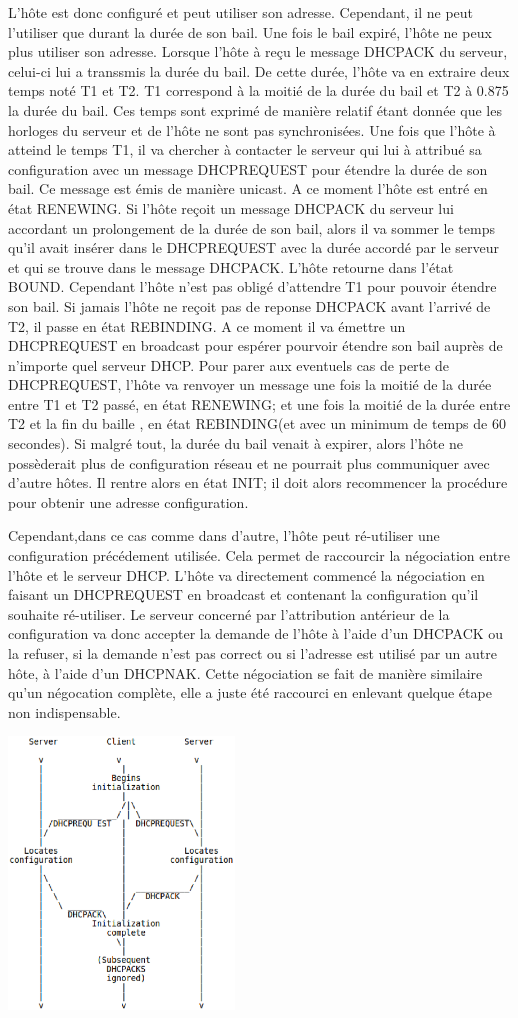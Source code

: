 L'hôte est donc configuré et peut utiliser son adresse. Cependant, il ne peut
l'utiliser que durant la durée de son bail. Une fois le bail expiré, l'hôte ne
peux plus utiliser son adresse. Lorsque l'hôte à reçu le message DHCPACK du
serveur, celui-ci lui a transsmis la durée du bail. De cette durée, l'hôte va
en extraire deux temps noté T1 et T2. T1 correspond à la moitié de la durée du
bail et T2 à 0.875 la durée du bail. Ces temps sont exprimé de manière relatif
étant donnée que les horloges du serveur et de l'hôte ne sont pas
synchronisées.  Une fois que l'hôte à atteind le temps T1, il va chercher à
contacter le serveur qui lui à attribué sa configuration avec un message
DHCPREQUEST pour étendre la durée de son bail. Ce message est émis de manière
unicast. A ce moment l'hôte est entré en état RENEWING. Si l'hôte reçoit un
message DHCPACK du serveur lui accordant un prolongement de la durée de son
bail, alors il va sommer le temps qu'il avait insérer dans le DHCPREQUEST avec
la durée accordé par le serveur et qui se trouve dans le message DHCPACK.
L'hôte retourne dans l'état BOUND. Cependant l'hôte n'est pas obligé d'attendre
T1 pour pouvoir étendre son bail.  Si jamais l'hôte ne reçoit pas de reponse
DHCPACK avant l'arrivé de T2, il passe en état REBINDING. A ce moment il va
émettre un DHCPREQUEST en broadcast pour espérer pourvoir étendre son bail
auprès de n'importe quel serveur DHCP. Pour parer aux eventuels cas de perte de
DHCPREQUEST, l'hôte va renvoyer un message une fois la moitié de la durée entre
T1 et T2 passé, en état RENEWING; et une fois la moitié de la durée entre T2 et
la fin du baille , en état REBINDING(et avec un minimum de temps de 60
secondes).  Si malgré tout, la durée du bail venait à expirer, alors l'hôte ne
possèderait plus de configuration réseau et ne pourrait plus communiquer avec
d'autre hôtes. Il rentre alors en état INIT; il doit alors recommencer la
procédure pour obtenir une adresse configuration.

Cependant,dans ce cas comme dans d'autre, l'hôte peut ré-utiliser une
configuration précédement utilisée. Cela permet de raccourcir la négociation
entre l'hôte et le serveur DHCP. L'hôte va directement commencé la négociation
en faisant un DHCPREQUEST en broadcast et contenant la configuration qu'il
souhaite ré-utiliser. Le serveur concerné par l'attribution antérieur de la
configuration va donc accepter la demande de l'hôte à l'aide d'un DHCPACK ou la
refuser, si la demande n'est pas correct ou si l'adresse est utilisé par un
autre hôte, à l'aide d'un DHCPNAK.  Cette négociation se fait de manière
similaire qu'un négocation complète, elle a juste été raccourci en enlevant
quelque étape non indispensable.

\includegraphics[width=6cm]{./pics/timeline_dhcp_reuse_add.eps}

